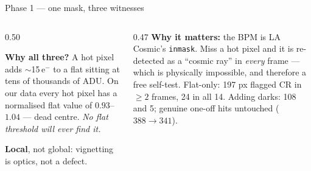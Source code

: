 \documentclass[10pt,aspectratio=169]{beamer}
\begin{document}
\begin{frame}{Phase 1 --- one mask, three witnesses}
  \vspace{0.5em}
  \begin{columns}[T]
    \begin{column}{0.50\textwidth}
      {\footnotesize \textbf{Why all three?} A hot pixel adds $\sim$15\,e$^-$ to a flat sitting
      at tens of thousands of ADU. On our data every hot pixel has a normalised flat value of
      $0.93$--$1.04$ --- dead centre. \emph{No flat threshold will ever find it.}
      \par\smallskip \textbf{Local}, not global: vignetting is optics, not a defect.}
    \end{column}
    \begin{column}{0.47\textwidth}
      {\footnotesize \textbf{Why it matters:} the BPM is LA\,Cosmic's \texttt{inmask}. Miss a
      hot pixel and it is re-detected as a ``cosmic ray'' in \emph{every} frame --- which is
      physically impossible, and therefore a free self-test.}
      \vspace{0.2em}
      {\tiny Flat-only: 197 px flagged CR in $\ge2$ frames, 24 in all 14.
      Adding darks: 108 and 5; genuine one-off hits untouched ($388\to341$).}
    \end{column}
  \end{columns}
\end{frame}
\end{document}
